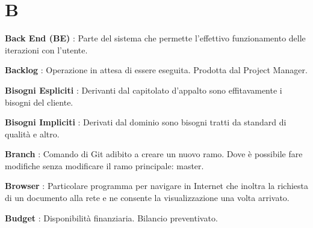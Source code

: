 \documentclass[12pt,a4paper,titlepage]{article}
\begin{document}
\section{B}
\begin{trivlist}
\item \textbf{Back End (BE)} : Parte del sistema che permette l'effettivo funzionamento delle iterazioni con l'utente.
\item \textbf{Backlog} : Operazione in attesa di essere eseguita. Prodotta dal Project Manager.
\item \textbf{Bisogni Espliciti} : Derivanti dal capitolato d'appalto sono effitavamente i bisogni del cliente.
\item \textbf{Bisogni Impliciti} : Derivati dal dominio sono bisogni tratti da standard di qualità e altro.
\item \textbf{Branch} : Comando di Git adibito a creare un nuovo ramo. Dove è possibile fare modifiche senza modificare il ramo principale: master.
\item \textbf{Browser} : Particolare programma per navigare in Internet che inoltra la richiesta di un documento alla rete e ne consente la visualizzazione una volta arrivato.
\item \textbf{Budget} : Disponibilità finanziaria. Bilancio preventivato.
\end{trivlist}

\end{document}
